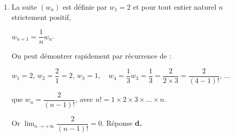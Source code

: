 \documentclass[10pt]{article}
\begin{document}
\begin{enumerate}
La limite est supérieure ou égale à 3. Réponse \textbf{b.}

\item  La suite $\left(w_n\right)$ est définie par $w_1 = 2$ et pour tout entier naturel $n$ strictement positif, 

$w_{n+1} = \dfrac1n w_n$.






On peut démontrer rapidement par récurrence de :

$w_1 = 2$, \quad $w_2 = \dfrac{2}{1} = 2$, \quad $w_3 = 1, \quad w_4 = \dfrac{1}{3}w_3 = \dfrac13 = \dfrac{2}{2 \times 3} = \dfrac{2}{(4 - 1)!}$, ...

que $w_n = \dfrac{2}{(n-1)!}$, avec $n! = 1 \times 2 \times 3 \times \ldots \times n$.

Or $\displaystyle\lim_{n \to + \infty}\dfrac{2}{(n- 1)!} = 0$. Réponse \textbf{d.}
\end{enumerate}

\bigskip
\end{document}
